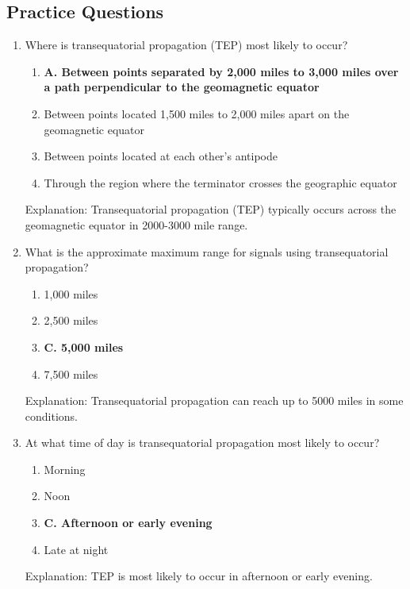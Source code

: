 \subsection*{Practice Questions}
\begin{enumerate}
    \item Where is transequatorial propagation (TEP) most likely to occur?
         \begin{enumerate}
       \item \textbf{A. Between points separated by 2,000 miles to 3,000 miles over a path perpendicular to the geomagnetic equator}
        \item  Between points located 1,500 miles to 2,000 miles apart on the geomagnetic equator
     \item  Between points located at each other's antipode
      \item  Through the region where the terminator crosses the geographic equator
     \end{enumerate}
    \textcolor{myred}{Explanation:}
      Transequatorial propagation (TEP) typically occurs across the geomagnetic equator in 2000-3000 mile range.
    
    \item What is the approximate maximum range for signals using transequatorial propagation?
      \begin{enumerate}
        \item  1,000 miles
      \item  2,500 miles
         \item \textbf{C. 5,000 miles}
      \item  7,500 miles
    \end{enumerate}
     \textcolor{myred}{Explanation:}
       Transequatorial propagation can reach up to 5000 miles in some conditions.

    \item At what time of day is transequatorial propagation most likely to occur?
    \begin{enumerate}
    \item  Morning
    \item  Noon
     \item \textbf{C. Afternoon or early evening}
   \item  Late at night
      \end{enumerate}
      \textcolor{myred}{Explanation:}
       TEP is most likely to occur in afternoon or early evening.
        

\end{enumerate}
